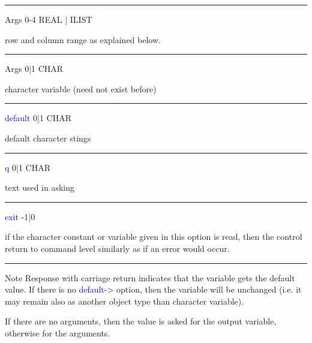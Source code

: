 \vspace{0.3cm}
\hrule
\vspace{0.3cm}
\noindent Args \tabto{3cm} 0-4 \tabto{5cm}  REAL | ILIST \tabto{7cm}
\begin{changemargin}{3cm}{0cm}
\noindent row and column range as explained below.

\end{changemargin}
\vspace{0.3cm}
\hrule
\vspace{0.3cm}
\noindent Args  \tabto{3cm}  0|1  \tabto{5cm}  CHAR  \tabto{7cm}
\begin{changemargin}{3cm}{0cm}
\noindent  character variable (need not exist before)

\end{changemargin}
\vspace{0.3cm}
\hrule
\vspace{0.3cm}
\noindent \textcolor{blue}{default} \tabto{3cm} 0|1 \tabto{5cm}  CHAR  \tabto{7cm}
\begin{changemargin}{3cm}{0cm}
\noindent  default character stings
\end{changemargin}
\vspace{0.3cm}
\hrule
\vspace{0.3cm}
\noindent \textcolor{blue}{q}  \tabto{3cm}  0|1  \tabto{5cm}  CHAR  \tabto{7cm}
\begin{changemargin}{3cm}{0cm}
\noindent text used in asking
\end{changemargin}
\vspace{0.3cm}
\hrule
\vspace{0.3cm}
\noindent \textcolor{blue}{exit} \tabto{3cm}  -1|0 \tabto{5cm}    \tabto{7cm}
\begin{changemargin}{3cm}{0cm}
\noindent  if the character constant or variable given in this option is read, then the control
return to command level similarly as if an error would occur.
\end {changemargin}
\hrule
\vspace{0.2cm}
\begin{note}
Note
Response with carriage return indicates that the variable gets the default value. If there is no
\textcolor{blue}{default->} option, then the variable will be unchanged (i.e. it may remain also as another
object type than character variable).
\end{note}
\begin{note}
If there are no arguments, then the value is asked for the output variable, otherwise for
the arguments.
\end{note}
